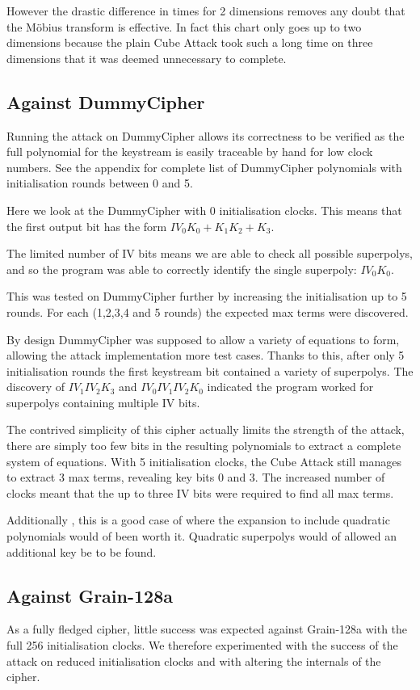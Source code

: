 \documentclass{report}
\let\Oldsubsection\subsection
\renewcommand{\subsection}{\FloatBarrier\Oldsubsection}
\begin{document}
However the drastic difference in times for 2 dimensions removes any doubt that the M\"{o}bius transform is effective. In fact this chart only goes up to two dimensions because the plain Cube Attack took such a long time on three dimensions that it was deemed unnecessary to complete.
\subsection{Against DummyCipher}
Running the attack on DummyCipher allows its correctness to be verified as the full polynomial for the keystream is easily traceable by hand for low clock numbers. See the appendix for complete list of DummyCipher polynomials with initialisation rounds between 0 and 5.

Here we look at the DummyCipher with 0 initialisation clocks. This means that the first output bit has the form $IV_0K_0+K_1K_2+K_3$.

The limited number of IV bits means we are able to check all possible superpolys, and so the program was able to correctly identify the single superpoly: $IV_0K_0$.

This was tested on DummyCipher further by increasing the initialisation up to 5 rounds. For each (1,2,3,4 and 5 rounds) the expected max terms were discovered.

By design DummyCipher was supposed to allow a variety of equations to form, allowing the attack implementation more test cases. Thanks to this, after only 5 initialisation rounds the first keystream bit contained a variety of superpolys. The discovery of $IV_1IV_2K_3$ and $IV_0IV_1IV_2K_0$ indicated the program worked for superpolys containing multiple IV bits.

The contrived simplicity of this cipher actually limits the strength of the attack, there are simply too few bits in the resulting polynomials to extract a complete system of equations. With 5 initialisation clocks, the Cube Attack still manages to extract 3 max terms, revealing key bits 0 and 3. The increased number of clocks meant that the up to three IV bits were required to find all max terms.

Additionally , this is a good case of where the expansion to include quadratic polynomials would of been worth it. Quadratic superpolys would of allowed an additional key be to be found.
\subsection{Against Grain-128a}
As a fully fledged cipher, little success was expected against Grain-128a with the full 256 initialisation clocks. We therefore experimented with the success of the attack on reduced initialisation clocks and with altering the internals of the cipher.
\end{document}
